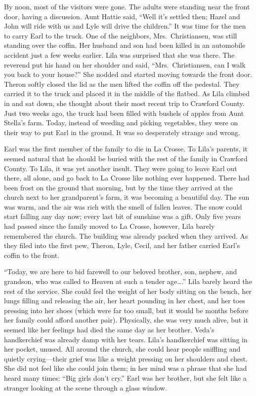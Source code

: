 \documentclass[
  letterpaper,
]{book}
\begin{document}
By noon, most of the visitors were gone. The adults were standing near
the front door, having a discussion. Aunt Hattie said, ``Well it's
settled then; Hazel and John will ride with us and Lyle will drive the
children.'' It was time for the men to carry Earl to the truck. One of
the neighbors, Mrs.~Christiansen, was still standing over the coffin.
Her husband and son had been killed in an automobile accident just a few
weeks earlier. Lila was surprised that she was there. The reverend put
his hand on her shoulder and said, ``Mrs.~Christiansen, can I walk you
back to your house?'' She nodded and started moving towards the front
door. Theron softly closed the lid as the men lifted the coffin off the
pedestal. They carried it to the truck and placed it in the middle of
the flatbed. As Lila climbed in and sat down, she thought about their
most recent trip to Crawford County. Just two weeks ago, the truck had
been filled with bushels of apples from Aunt Stella's farm. Today,
instead of weeding and picking vegetables, they were on their way to put
Earl in the ground. It was so desperately strange and wrong.

Earl was the first member of the family to die in La Crosse. To Lila's
parents, it seemed natural that he should be buried with the rest of the
family in Crawford County. To Lila, it was yet another insult. They were
going to leave Earl out there, all alone, and go back to La Crosse like
nothing ever happened. There had been frost on the ground that morning,
but by the time they arrived at the church next to her grandparent's
farm, it was becoming a beautiful day. The sun was warm, and the air was
rich with the smell of fallen leaves. The snow could start falling any
day now; every last bit of sunshine was a gift. Only five years had
passed since the family moved to La Crosse, however, Lila barely
remembered the church. The building was already packed when they
arrived. As they filed into the first pew, Theron, Lyle, Cecil, and her
father carried Earl's coffin to the front.

``Today, we are here to bid farewell to our beloved brother, son,
nephew, and grandson, who was called to Heaven at such a tender
age\ldots.'' Lila barely heard the rest of the service. She could feel
the weight of her body sitting on the bench, her lungs filling and
releasing the air, her heart pounding in her chest, and her toes
pressing into her shoes (which were far too small, but it would be
months before her family could afford another pair). Physically, she was
very much alive, but it seemed like her feelings had died the same day
as her brother. Veda's handkerchief was already damp with her tears.
Lila's handkerchief was sitting in her pocket, unused. All around the
church, she could hear people sniffling and quietly crying---their grief
was like a weight pressing on her shoulders and chest. She did not feel
like she could join them; in her mind was a phrase that she had heard
many times: ``Big girls don't cry.'' Earl was her brother, but she felt
like a stranger looking at the scene through a glass window.
\end{document}
